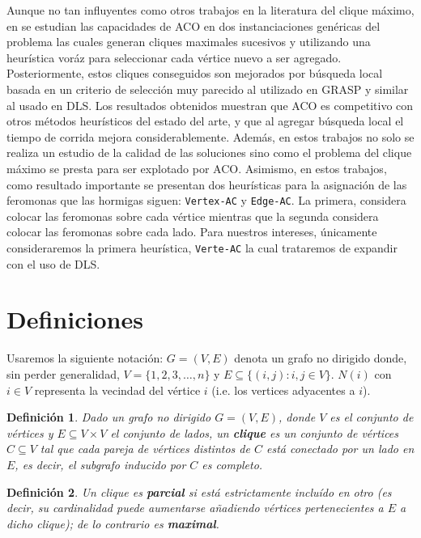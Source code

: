 \documentclass[conference]{IEEEtran}
\newtheorem{mydef}{Definición}
\begin{document}
Aunque no tan influyentes como otros trabajos en la literatura del
clique máximo, en \cite{aco1, aco2} se estudian las capacidades de ACO
en dos instanciaciones genéricas del problema las cuales generan
cliques maximales sucesivos y utilizando una heurística voráz para
seleccionar cada vértice nuevo a ser agregado. Posteriormente, estos
cliques conseguidos son mejorados por búsqueda local basada en un
criterio de selección muy parecido al utilizado en GRASP y similar al
usado en DLS. Los resultados obtenidos muestran que ACO es competitivo
con otros métodos heurísticos del estado del arte, y que al agregar
búsqueda local el tiempo de corrida mejora considerablemente. Además,
en estos trabajos no solo se realiza un estudio de la calidad de las
soluciones sino como el problema del clique máximo se presta para ser
explotado por ACO. Asimismo, en estos trabajos, como resultado
importante se presentan dos heurísticas para la asignación de las
feromonas que las hormigas siguen: \texttt{Vertex-AC} y
\texttt{Edge-AC}. La primera, considera colocar las feromonas sobre
cada vértice mientras que la segunda considera colocar las feromonas
sobre cada lado. Para nuestros intereses, únicamente consideraremos la
primera heurística, \texttt{Verte-AC} la cual trataremos de expandir
con el uso de DLS.

\section{Definiciones}
\label{sec:defs}

Usaremos la siguiente notación: $G = (V,E)$ denota un grafo no
dirigido donde, sin perder generalidad, $V = \{1, 2, 3, …, n\}$ y $E
\subseteq \{(i, j): i, j \in V\}$. $N(i)$ con $i \in V$ representa la
vecindad del vértice $i$ (i.e. los vertices adyacentes a $i$).

\begin{mydef}
  Dado un grafo no dirigido $G = (V,E)$, donde $V$ es el conjunto
  de vértices y $E \subseteq V \times V$ el conjunto de lados, un
  \textbf{clique} es un conjunto de vértices $C \subseteq V$ tal que cada
  pareja de vértices distintos de $C$ está conectado por un lado en
  $E$, es decir, el subgrafo inducido por $C$ es completo.
\end{mydef}

\begin{mydef}
  Un \emph{clique} es \textbf{parcial} si está estrictamente incluído
  en otro (es decir, su cardinalidad puede aumentarse añadiendo
  vértices pertenecientes a $E$ a dicho clique); de lo contrario es
  \textbf{maximal}.
\end{mydef}
\end{document}
